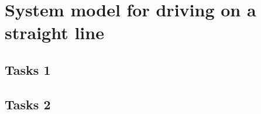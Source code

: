 \documentclass[11pt,titlepage]{report}
\begin{document}
\chapter{System model for driving on a straight line}
\section{Tasks 1}

\section{Tasks 2}
\end{document}
